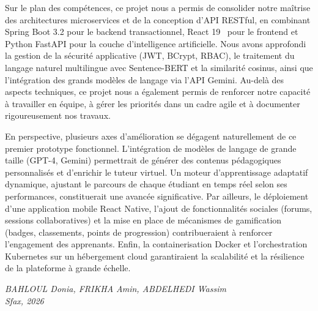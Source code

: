 \documentclass[12pt,a4paper]{report}
\begin{document}
Sur le plan des compétences, ce projet nous a permis de consolider notre maîtrise des architectures microservices et de la conception d'API RESTful, en combinant Spring Boot 3.2 pour le backend transactionnel, React 19~\cite{react} pour le frontend et Python FastAPI pour la couche d'intelligence artificielle. Nous avons approfondi la gestion de la sécurité applicative (JWT, BCrypt, RBAC), le traitement du langage naturel multilingue avec Sentence-BERT et la similarité cosinus, ainsi que l'intégration des grands modèles de langage via l'API Gemini. Au-delà des aspects techniques, ce projet nous a également permis de renforcer notre capacité à travailler en équipe, à gérer les priorités dans un cadre agile et à documenter rigoureusement nos travaux.

En perspective, plusieurs axes d'amélioration se dégagent naturellement de ce premier prototype fonctionnel. L'intégration de modèles de langage de grande taille (GPT-4, Gemini) permettrait de générer des contenus pédagogiques personnalisés et d'enrichir le tuteur virtuel. Un moteur d'apprentissage adaptatif dynamique, ajustant le parcours de chaque étudiant en temps réel selon ses performances, constituerait une avancée significative. Par ailleurs, le déploiement d'une application mobile React Native, l'ajout de fonctionnalités sociales (forums, sessions collaboratives) et la mise en place de mécanismes de gamification (badges, classements, points de progression) contribueraient à renforcer l'engagement des apprenants. Enfin, la containerisation Docker et l'orchestration Kubernetes sur un hébergement cloud garantiraient la scalabilité et la résilience de la plateforme à grande échelle.

\vspace{1cm}
\begin{flushright}
\textit{BAHLOUL Donia, FRIKHA Amin, ABDELHEDI Wassim}\\
\textit{Sfax, 2026}
\end{flushright}

\newpage

\renewcommand\bibname{Références Bibliographiques}
\end{document}
